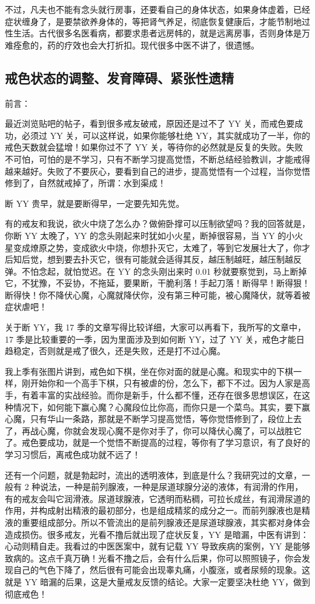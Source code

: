 \documentclass{ctexart}
\begin{document}
不过，凡夫也不能有念头就行房事，还要看自己的身体状态，如果身体虚着，已经症状缠身了，是要禁欲养身体的，等把肾气养足，彻底恢复健康后，才能节制地过性生活。古代很多名医看病，都要求患者远房帏的，就是远离房事，否则身体是万难痊愈的，药的疗效也会大打折扣。现代很多中医不讲了，很遗憾。

\subsection{戒色状态的调整、发育障碍、紧张性遗精}

前言：

最近浏览贴吧的帖子，看到很多戒友破戒，原因还是过不了 YY 关，而戒色要成功，必须过 YY 关，可以这样说，如果你能够杜绝 YY，其实就成功了一半，你的戒色天数就会猛增！如果你过不了 YY 关，等待你的必然就是反复的失败。失败不可怕，可怕的是不学习，只有不断学习提高觉悟，不断总结经验教训，才能戒得越来越好。失败了不要灰心，要看到自己的进步，提高觉悟有一个过程，当你觉悟修到了，自然就戒掉了，所谓：水到渠成！

断 YY 贵早，就是要断得早，一定要先知先觉。

有的戒友和我说，欲火中烧了怎么办？做俯卧撑可以压制欲望吗？我的回答就是，你断 YY 太晚了，YY 的念头刚起来时犹如小火星，断掉很容易，当 YY 的小火星变成燎原之势，变成欲火中烧，你想扑灭它，太难了，等到它发展壮大了，你才后知后觉，想到要去扑灭它，很有可能就会适得其反，越压制越旺，越压制越反弹。不怕念起，就怕觉迟。在 YY 的念头刚出来时 0.01 秒就要察觉到，马上断掉它，不犹豫，不妥协，不拖延，要果断，干脆利落！手起刀落！断得早！断得狠！断得快！你不降伏心魔，心魔就降伏你，没有第三种可能，被心魔降伏，就等着被症状虐吧！

关于断 YY，我 17 季的文章写得比较详细，大家可以再看下，我所写的文章中，17 季是比较重要的一季，因为里面涉及到如何断 YY，过了 YY 关，戒色才能日趋稳定，否则就是戒了很久，还是失败，还是打不过心魔。

我上季有张图片讲到，戒色如下棋，坐在你对面的就是心魔。和现实中的下棋一样，刚开始你和一个高手下棋，只有被虐的份，怎么下，都下不过。因为人家是高手，有着丰富的实战经验。而你是新手，什么都不懂，还存在很多思想误区，在这种情况下，如何能下赢心魔？心魔段位比你高，而你只是一个菜鸟。其实，要下赢心魔，只有华山一条路，那就是不断学习提高觉悟，等你觉悟修到了，段位上去了，再战心魔，你就会发现心魔不是你对手了，你可以降伏心魔了，可以战胜它了。戒色要成功，就是一个觉悟不断提高的过程，等你有了学习意识，有了良好的学习习惯后，离戒色成功就不远了！

还有一个问题，就是勃起时，流出的透明液体，到底是什么？我研究过的文章，一般有 2 种说法，一种是前列腺液，一种是尿道球腺分泌的液体，有润滑的作用，有的戒友会叫它润滑液。尿道球腺液，它透明而粘稠，可拉长成丝，有润滑尿道的作用，并构成射出精液的最初部分，也是组成精浆的成分之一。而前列腺液也是精液的重要组成部分。所以不管流出的是前列腺液还是尿道球腺液，其实都对身体会造成损伤。很多戒友，光看不撸后就出现了症状反复，YY 是暗漏，中医有讲到：心动则精自走。我看过的中医医案中，就有记载 YY 导致疾病的案例，YY 是能够致病的。这点千真万确！光看不撸之后，会有什么后果，你可以照照镜子，你会发现自己的气色下降了，然后很有可能会出现睾丸痛，小腹涨，或者尿频的现象。这就是 YY 暗漏的后果，这是大量戒友反馈的结论。大家一定要坚决杜绝 YY，做到彻底戒色！
\end{document}
